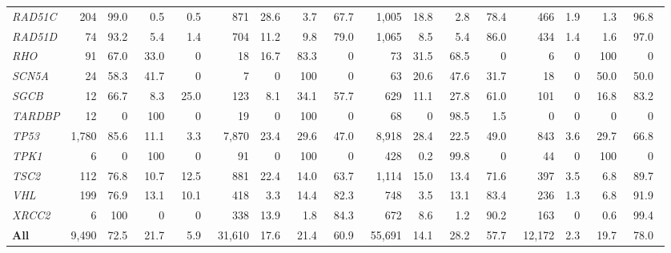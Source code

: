 \begin{tabular}{@{}l rrrr rrrr rrrr rrrr@{}}
\textit{RAD51C} & 204 & 99.0\ & 0.5\ & 0.5\ & 871 & 28.6\ & 3.7\ & 67.7\ & 1,005 & 18.8\ & 2.8\ & 78.4\ & 466 & 1.9\ & 1.3\ & 96.8\ \\
\textit{RAD51D} & 74 & 93.2\ & 5.4\ & 1.4\ & 704 & 11.2\ & 9.8\ & 79.0\ & 1,065 & 8.5\ & 5.4\ & 86.0\ & 434 & 1.4\ & 1.6\ & 97.0\ \\
\textit{RHO} & 91 & 67.0\ & 33.0\ & 0\ & 18 & 16.7\ & 83.3\ & 0\ & 73 & 31.5\ & 68.5\ & 0\ & 6 & 0\ & 100\ & 0\ \\
\textit{SCN5A} & 24 & 58.3\ & 41.7\ & 0\ & 7 & 0\ & 100\ & 0\ & 63 & 20.6\ & 47.6\ & 31.7\ & 18 & 0\ & 50.0\ & 50.0\ \\
\textit{SGCB} & 12 & 66.7\ & 8.3\ & 25.0\ & 123 & 8.1\ & 34.1\ & 57.7\ & 629 & 11.1\ & 27.8\ & 61.0\ & 101 & 0\ & 16.8\ & 83.2\ \\
\textit{TARDBP} & 12 & 0\ & 100\ & 0\ & 19 & 0\ & 100\ & 0\ & 68 & 0\ & 98.5\ & 1.5\ & 0 & 0\ & 0\ & 0\ \\
\textit{TP53} & 1,780 & 85.6\ & 11.1\ & 3.3\ & 7,870 & 23.4\ & 29.6\ & 47.0\ & 8,918 & 28.4\ & 22.5\ & 49.0\ & 843 & 3.6\ & 29.7\ & 66.8\ \\
\textit{TPK1} & 6 & 0\ & 100\ & 0\ & 91 & 0\ & 100\ & 0\ & 428 & 0.2\ & 99.8\ & 0\ & 44 & 0\ & 100\ & 0\ \\
\textit{TSC2} & 112 & 76.8\ & 10.7\ & 12.5\ & 881 & 22.4\ & 14.0\ & 63.7\ & 1,114 & 15.0\ & 13.4\ & 71.6\ & 397 & 3.5\ & 6.8\ & 89.7\ \\
\textit{VHL} & 199 & 76.9\ & 13.1\ & 10.1\ & 418 & 3.3\ & 14.4\ & 82.3\ & 748 & 3.5\ & 13.1\ & 83.4\ & 236 & 1.3\ & 6.8\ & 91.9\ \\
\textit{XRCC2} & 6 & 100\ & 0\ & 0\ & 338 & 13.9\ & 1.8\ & 84.3\ & 672 & 8.6\ & 1.2\ & 90.2\ & 163 & 0\ & 0.6\ & 99.4\ \\
\midrule
\textbf{All} & 9,490 & 72.5\ & 21.7\ & 5.9\ & 31,610 & 17.6\ & 21.4\ & 60.9\ & 55,691 & 14.1\ & 28.2\ & 57.7\ & 12,172 & 2.3\ & 19.7\ & 78.0\ \\
\bottomrule
\end{tabular}

